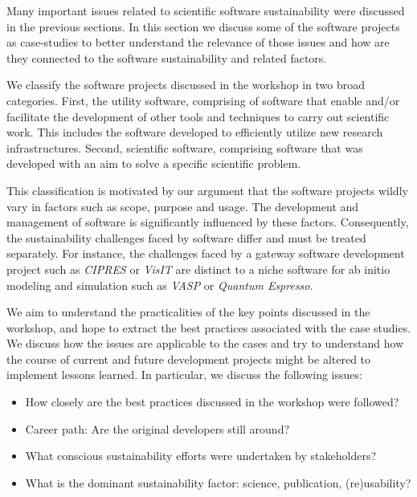 \documentclass[11pt, oneside]{amsart}
\begin{document}
Many important issues related to scientific software sustainability were
discussed in the previous sections. In this section we discuss some of the
software projects as case-studies to better understand the relevance of those
issues and how are they connected to the software sustainability and related
factors.

We classify the software projects discussed in the workshop in two broad
categories. First, the utility software, comprising of software that enable
and/or facilitate the development of other tools and techniques to carry out
scientific work. This includes the software developed to efficiently utilize
new research infrastructures. Second, scientific software, comprising software
that was developed with an aim to solve a specific scientific problem.

This classification is motivated by our argument that the software projects
wildly vary in factors such as scope, purpose and usage. The development and
management of software is significantly influenced by these factors.
Consequently, the sustainability challenges faced by software differ and must
be treated separately. For instance, the challenges faced by a gateway software
development project such as \textit{CIPRES} or \textit{VisIT} are distinct to a
niche software for ab initio modeling and simulation such as \textit{VASP} or
\textit{Quantum Espresso}.

We aim to understand the practicalities of the key points discussed in the
workshop, and hope to extract the best practices associated with the case
studies. We discuss how the issues are applicable to the cases and try to
understand how the course of current and future development projects might be
altered to implement lessons learned. In particular, we discuss the following issues:
\begin{itemize}
    \item How closely are the best practices discussed in the workshop were followed?
    \item Career path: Are the original developers still around?
    \item What conscious sustainability efforts were undertaken by stakeholders?
    \item What is the dominant sustainability factor: science, publication, (re)usability?
\end{itemize}
\end{document}
